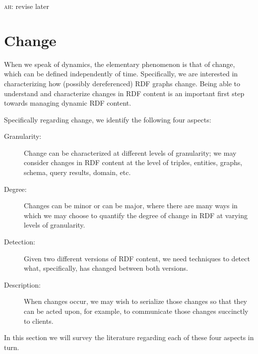 \documentclass[sw]{iosart2x}
\newcommand{\ah}[1]{{\color{blue!70!black}\textsc{ah:} #1}}
\begin{document}
\ah{revise later}

\section{Change}\label{Change}

When we speak of dynamics, the elementary phenomenon is that of change, which can be defined independently of time. Specifically, we are interested in characterizing how (possibly dereferenced) RDF graphs change. Being able to understand and characterize changes in RDF content is an important first step towards managing dynamic RDF content.

Specifically regarding change, we identify the following four aspects:

\begin{description}
\item[Granularity:] Change can be characterized at different levels of granularity; we may consider changes in RDF content at the level of triples, entities, graphs, schema, query results, domain, etc.
\item[Degree:] Changes can be minor or can be major, where there are many ways in which we may choose to quantify the degree of change in RDF at varying levels of granularity.
\item[Detection:] Given two different versions of RDF content, we need techniques to detect what, specifically, has changed between both versions.
\item[Description:] When changes occur, we may wish to serialize those changes so that they can be acted upon, for example, to communicate those changes succinctly to clients.
\end{description}

In this section we will survey the literature regarding each of these four aspects in turn.



\end{document}
